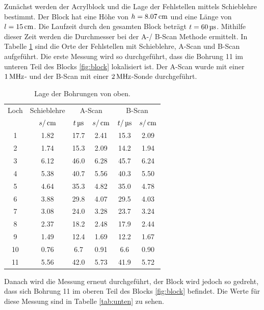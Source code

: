 Zunächst werden der Acrylblock und die Lage der Fehlstellen mittels Schieblehre
bestimmt. Der Block hat eine Höhe von $h=8.07\,\si{\centi\meter}$ und eine Länge von $l=15\,\si{\centi\meter}$.
Die Laufzeit durch den gesamten Block beträgt $t=60\,\si{\micro\second}$. Mithilfe dieser Zeit
werden die Durchmesser bei der A-/ B-Scan Methode ermittelt.
In Tabelle \ref{tab:oben} sind die Orte der Fehlstellen mit Schieblehre, A-Scan
und B-Scan aufgeführt. Die erste Messung wird so durchgeführt, dass die Bohrung
11 im unteren Teil des Blocks \ref{fig:block} lokalisiert ist. Der A-Scan wurde
mit einer $1\,\si{\mega\hertz}$- und der B-Scan mit einer $2\,\si{\mega\hertz}$-Sonde durchgeführt.
\begin{table}[H]
  \centering
  \begin{tabular}{c|c|cc|cc}
    \toprule
    \multicolumn{1}{c|}{Loch}& \multicolumn{1}{c|}{Schieblehre} & \multicolumn{2}{c|}{A-Scan}
    & \multicolumn{2}{c}{B-Scan} \\
    & $s/\,\si{\centi\meter}$ & $t\,\si{\micro\second}$ & $s/\,\si{\centi\meter}$ & $t/\,\si{\micro\second}$ & $s/\,\si{\centi\meter}$ \\
    \midrule
     1  &  1.82 &  17.7 & 2.41 & 15.3 & 2.09 \\
     2  &  1.74 &  15.3 & 2.09 & 14.2 & 1.94 \\
     3  &  6.12 &  46.0 & 6.28 & 45.7 & 6.24 \\
     4  &  5.38 &  40.7 & 5.56 & 40.3 & 5.50 \\
     5  &  4.64 &  35.3 & 4.82 & 35.0 & 4.78 \\
     6  &  3.88 &  29.8 & 4.07 & 29.5 & 4.03 \\
     7  &  3.08 &  24.0 & 3.28 & 23.7 & 3.24 \\
     8  &  2.37 &  18.2 & 2.48 & 17.9 & 2.44 \\
     9  &  1.49 &  12.4 & 1.69 & 12.2 & 1.67 \\
    10  &  0.76 &   6.7 & 0.91 &  6.6 & 0.90 \\
    11  &  5.56 &  42.0 & 5.73 & 41.9 & 5.72 \\
    \bottomrule
  \end{tabular}
  \caption{Lage der Bohrungen von oben.}
  \label{tab:oben}
\end{table}
\noindent Danach wird die Messung erneut durchgeführt, der Block wird jedoch so gedreht,
dass sich Bohrung 11 im oberen Teil des Blocks \ref{fig:block} befindet.
Die Werte für diese Messung sind in Tabelle \ref{tab:unten} zu sehen.
